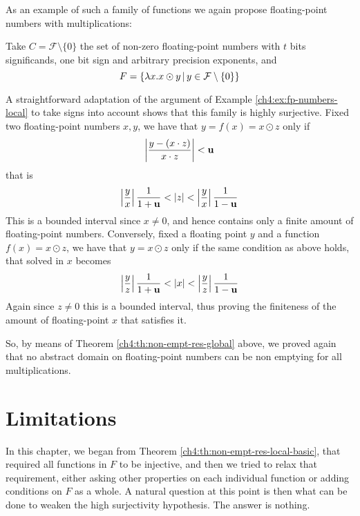 As an example of such a family of functions we again propose floating-point numbers with multiplications:
\begin{example}\label{ch4:ex:fp-numbers-global}
	Take $C = \mathcal{F} \setminus \{ 0 \}$ the set of non-zero floating-point numbers with $t$ bits significands, one bit sign and arbitrary precision exponents, and
	\[
	F = \{ \lambda x . x \odot y \,\vert\, y \in \mathcal{F} \setminus \{ 0 \} \}
	\]

	A straightforward adaptation of the argument of Example \ref{ch4:ex:fp-numbers-local} to take signs into account shows that this family is highly surjective.
	Fixed two floating-point numbers $x, y$, we have that $y = f(x) = x \odot z$ only if
	\[
	\left\lvert \frac{y - (x \cdot z)}{x \cdot z} \right\rvert < \textbf{u}
	\]
	that is
	\[
	\left\lvert\frac{y}{x}\right\rvert \frac{1}{1+\textbf{u}} < \lvert z\rvert < \left\lvert\frac{y}{x}\right\rvert \frac{1}{1-\textbf{u}}
	\]
	This is a bounded interval since $x \neq 0$, and hence contains only a finite amount of floating-point numbers.
	Conversely, fixed a floating point $y$ and a function $f(x) = x \odot z$, we have that $y = x \odot z$ only if the same condition as above holds, that solved in $x$ becomes
	\[
	\left\lvert\frac{y}{z}\right\rvert \frac{1}{1+\textbf{u}} < \lvert x\rvert < \left\lvert\frac{y}{z}\right\rvert \frac{1}{1-\textbf{u}}
	\]
	Again since $z \neq 0$ this is a bounded interval, thus proving the finiteness of the amount of floating-point $x$ that satisfies it.

	So, by means of Theorem \ref{ch4:th:non-empt-res-global} above, we proved again that no abstract domain on floating-point numbers can be non emptying for all multiplications.
\end{example}

\section{Limitations}\label{ch5:sec:limitations}
In this chapter, we began from Theorem \ref{ch4:th:non-empt-res-local-basic}, that required all functions in $F$ to be injective, and then we tried to relax that requirement, either asking other properties on each individual function or adding conditions on $F$ as a whole.
A natural question at this point is then what can be done to weaken the high surjectivity hypothesis. The answer is nothing.

